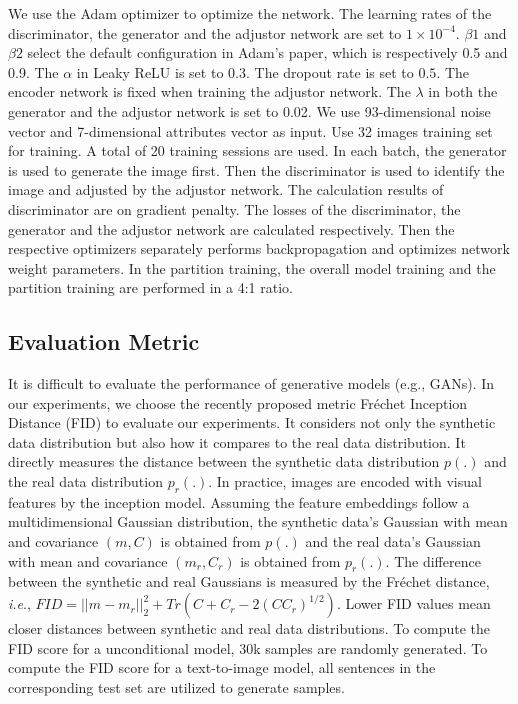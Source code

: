 We use the Adam optimizer to optimize the network.
The learning rates of the discriminator, the generator and the adjustor network are set to $1\times10^{-4}$.
$\beta1$ and $\beta2$ select the default configuration in Adam's paper, which is respectively 0.5 and 0.9.
The $\alpha$ in Leaky ReLU is set to $0.3$.
The dropout rate is set to $0.5$.
The encoder network is fixed when training the adjustor network.
The $\lambda$ in both the generator and the adjustor network is set to 0.02.
We use 93-dimensional noise vector and 7-dimensional attributes vector as input.
Use 32 images training set for training.
A total of 20 training sessions are used.
In each batch, the generator is used to generate the image first.
Then the discriminator is used to identify the image and adjusted by the adjustor network.
The calculation results of discriminator are on gradient penalty.
The losses of the discriminator, the generator and the adjustor network are calculated respectively.
Then the respective optimizers separately performs backpropagation and optimizes network weight parameters.
In the partition training, the overall model training and the partition training are performed in a 4:1 ratio.

\subsection{Evaluation Metric}
It is difficult to evaluate the performance of generative models (e.g., GANs).
In our experiments, we choose the recently proposed metric Fr\'echet Inception Distance (FID) to evaluate our experiments.
It considers not only the synthetic data distribution but also how it compares to the real data distribution.
It directly measures the distance between the synthetic data distribution $p(.)$ and the real data distribution $p_r(.)$.
In practice, images are encoded with visual features by the inception model.
Assuming the feature embeddings follow a multidimensional Gaussian distribution,
    the synthetic data's Gaussian with mean and covariance $(m, C)$ is obtained from $p(.)$ and the real data's Gaussian with mean and covariance $(m_r, C_r)$ is obtained from $p_r(.)$.
The difference between the synthetic and real Gaussians is measured by the Fr\'echet distance, \emph{i.e}., $FID = ||m-m_r||_{2}^{2} + Tr\left(C + C_r - 2(CC_r)^{1/2}\right)$. Lower FID values mean closer distances between synthetic and real data distributions.
To compute the FID score for a unconditional model, 30k samples are randomly generated. To compute the FID score for a text-to-image model, all sentences in the corresponding test set are utilized to generate samples. 


